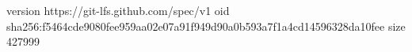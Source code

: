 version https://git-lfs.github.com/spec/v1
oid sha256:f5464cde9080fee959aa02e07a91f949d90a0b593a7f1a4cd14596328da10fee
size 427999
